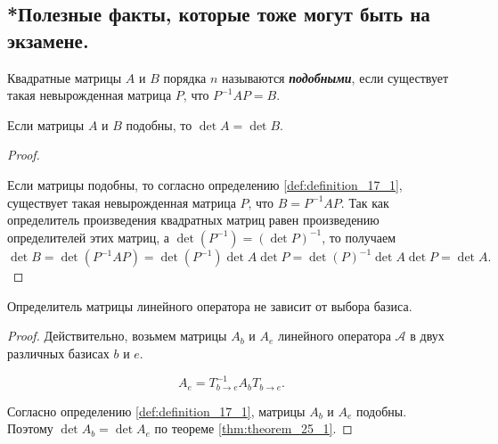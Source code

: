 \subsection{
    *Полезные факты, которые тоже могут быть на экзамене.
}

\begin{definition}
    Квадратные матрицы $A$ и $B$ порядка $n$ называются \textit{\textbf{подобными}}, если существует такая невырожденная матрица $P$, что $P^{-1}AP = B$.
    \label{def:definition_17_1}
\end{definition}

\begin{theorem}
    Если матрицы $A$ и $B$ подобны, то $\det A = \det B$.
    \label{thm:theorem_25_1}
\end{theorem}

\begin{proof}~

    Если матрицы подобны, то согласно определению \eqref{def:definition_17_1}, существует такая невырожденная матрица $P$, что $B = P^{-1}AP$. Так как определитель произведения квадратных матриц равен произведению определителей этих матриц, а $\det(P^{-1}) = (\det P)^{-1}$, то получаем
    $$\det B = \det(P^{-1}AP) = \det(P^{-1})\det A \det P = \det(P)^{-1}\det A \det P = \det A.$$
\end{proof}

\begin{corollary}
    Определитель матрицы линейного оператора не зависит от выбора базиса.
\end{corollary}

\begin{proof}
    Действительно, возьмем матрицы $A_b$ и $A_e$ линейного оператора $\mathscr{A}$ в двух различных базисах $b$ и $e$.

    $$A_e = T^{-1}_{b \to e}A_bT_{b \to e}.$$

    Согласно определению \eqref{def:definition_17_1}, матрицы $A_b$ и $A_e$ подобны. Поэтому $\det A_b = \det A_e$ по теореме \ref{thm:theorem_25_1}.
\end{proof}
